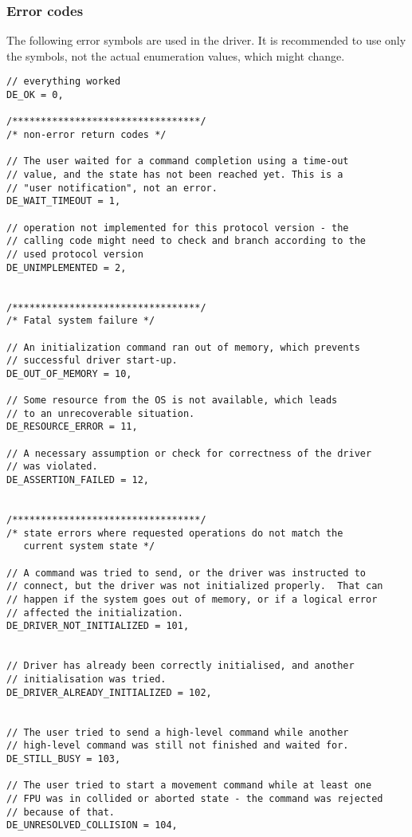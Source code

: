 \documentclass{scrartcl}[12pt,a4paper]
\begin{document}
\subsubsection{Error codes}

The following error symbols are used in the driver.  It is recommended
to use only the symbols, not the actual enumeration values, which
might change.


\begin{verbatim}
// everything worked
DE_OK = 0,

/*********************************/
/* non-error return codes */

// The user waited for a command completion using a time-out
// value, and the state has not been reached yet. This is a
// "user notification", not an error.
DE_WAIT_TIMEOUT = 1,

// operation not implemented for this protocol version - the
// calling code might need to check and branch according to the
// used protocol version
DE_UNIMPLEMENTED = 2,


/*********************************/
/* Fatal system failure */

// An initialization command ran out of memory, which prevents
// successful driver start-up.
DE_OUT_OF_MEMORY = 10,

// Some resource from the OS is not available, which leads
// to an unrecoverable situation.
DE_RESOURCE_ERROR = 11,

// A necessary assumption or check for correctness of the driver
// was violated.
DE_ASSERTION_FAILED = 12,


/*********************************/
/* state errors where requested operations do not match the
   current system state */

// A command was tried to send, or the driver was instructed to
// connect, but the driver was not initialized properly.  That can
// happen if the system goes out of memory, or if a logical error
// affected the initialization.
DE_DRIVER_NOT_INITIALIZED = 101,


// Driver has already been correctly initialised, and another
// initialisation was tried.
DE_DRIVER_ALREADY_INITIALIZED = 102,


// The user tried to send a high-level command while another
// high-level command was still not finished and waited for.
DE_STILL_BUSY = 103,

// The user tried to start a movement command while at least one
// FPU was in collided or aborted state - the command was rejected
// because of that.
DE_UNRESOLVED_COLLISION = 104,


\end{verbatim}
\end{document}
